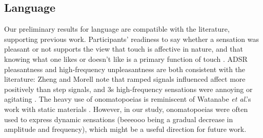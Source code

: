 %
%
\subsection{Language}

Our preliminary results for language are compatible with the literature,
supporting previous work.
Participants' readiness to say whether a sensation was pleasant or not supports the 
view that touch is affective in nature, and that knowing what one likes or doesn't like is a primary function of touch \cite{Jansson-Boyd2011}.
ADSR pleasantness and high-frequency unpleasantness are both consistent with the literature: Zheng and Morell note that ramped signals influenced affect more positively than step signals, and 3s high-frequency sensations were annoying or agitating \cite{Zheng2012}.
The heavy use of onomatopoeias is reminiscent of Watanabe \emph{et al}.'s work with static materials \cite{JunjiWatanabeTomohikoHayakawaShigeruMatsuiArisaKanoYuichiroShimizu2012}.
However, in our study, onomatopoeias were often used to express dynamic sensations (beeeooo being a gradual decrease in amplitude and frequency), which might be a useful direction for future work.



%
%
